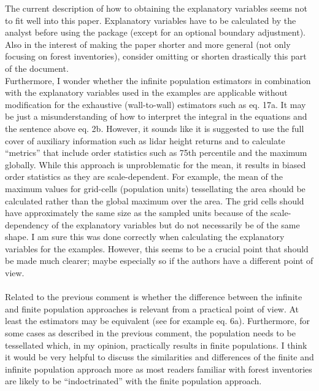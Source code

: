 \documentclass{article}
\begin{document}
The current description of how to obtaining the explanatory variables seems not to fit well into this paper. Explanatory variables have to be calculated by the analyst before using the package (except for an optional boundary adjustment). Also in the interest of making the paper shorter and more general (not only focusing on forest inventories), consider omitting or shorten drastically this part of the document.\\

Furthermore, I wonder whether the infinite population estimators in combination with the explanatory variables used in the examples are applicable without modification for the exhaustive (wall-to-wall) estimators such as eq. 17a. It may be just a misunderstanding of how to interpret the integral in the equations and the sentence above eq. 2b. However, it sounds like it is suggested to use the full cover of auxiliary information such as lidar height returns and to calculate “metrics” that include order statistics such as 75th percentile and the maximum globally. While this approach is unproblematic for the mean, it results in biased order statistics as they are scale-dependent. For example, the mean of the maximum values for grid-cells (population units) tessellating the area should be calculated rather than the global maximum over the area. The grid cells should have approximately the same size as the sampled units because of the scale-dependency of the explanatory variables but do not necessarily be of the same shape. I am sure this was done correctly when calculating the explanatory variables for the examples. However, this seems to be a crucial point that should be made much clearer; maybe especially so if the authors have a different point of view.\\

 \\


Related to the previous comment is whether the difference between the infinite and finite population approaches is relevant from a practical point of view. At least the estimators may be equivalent (see for example eq. 6a). Furthermore, for some cases as described in the previous comment, the population needs to be tessellated which, in my opinion, practically results in finite populations. I think it would be very helpful to discuss the similarities and differences of the finite and infinite population approach more as most readers familiar with forest inventories are likely to be “indoctrinated” with the finite population approach.\\
\end{document}

